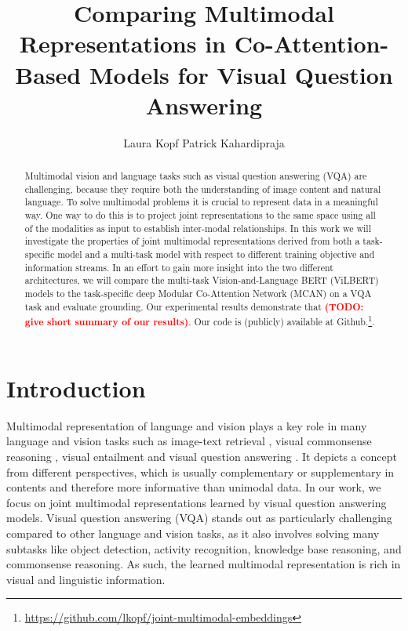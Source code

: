 \documentclass{article}
\title{Comparing Multimodal Representations in Co-Attention-Based Models for Visual Question Answering}
\author{%
   Laura Kopf%
  \And
   Patrick Kahardipraja \\
}
\newcommand{\todo}[1]{\textbf{\textcolor{Red}{(TODO: #1)}}}
\begin{document}
\maketitle


\begin{abstract}
Multimodal vision and language tasks such as visual question answering (VQA) are challenging, because they require both the understanding of image content and natural language. To solve multimodal problems it is crucial to represent data in a meaningful way. One way to do this is to project joint representations to the same space using all of the modalities as input to establish inter-modal relationships. In this work we will investigate the properties of joint multimodal representations derived from both a task-specific model and a multi-task model with respect to different training objective and information streams. In an effort to gain more insight into the two different architectures, we will compare the multi-task Vision-and-Language BERT (ViLBERT) \citep{lu2020multitask} models to the task-specific deep Modular Co-Attention Network (MCAN) \citep{yu2019mcan} on a VQA task and evaluate grounding. Our experimental results demonstrate that \todo{give short summary of our results}. Our code is (publicly) available at Github.\footnote{\url{https://github.com/lkopf/joint-multimodal-embeddings}}.
\end{abstract}

\section{Introduction}
Multimodal representation of language and vision plays a key role in many language and vision tasks such as image-text retrieval \citep{wang2016retrieval}, visual commonsense reasoning \citep{zellers2019vcr}, visual entailment \citep{xie2019entailment} and visual question answering \citep{antol2015vqa}. It depicts a concept from different perspectives, which is usually complementary or supplementary in contents and therefore more informative than unimodal data. In our work, we focus on joint multimodal representations learned by visual question answering models. Visual question answering (VQA) stands out as particularly challenging compared to other language and vision tasks, as it also involves solving many subtasks like object detection, activity recognition, knowledge base reasoning, and commonsense reasoning. As such, the learned multimodal representation is rich in visual and linguistic information. 
\end{document}
